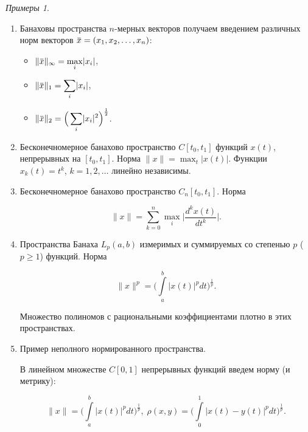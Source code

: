 \documentclass[12pt,a4paper,titlepage,oneside]{book}
\newcommand{\overbar}[1]{\mkern 1.5mu\overline{\mkern-1.5mu#1\mkern-1.5mu}\mkern 1.5mu}
\theoremstyle{definition}
\theoremstyle{plain}
\theoremstyle{break}
\theoremstyle{remark}
\theoremstyle{remark}
\theoremstyle{remark}
\newtheorem*{examples}{Примеры}
\theoremstyle{remark}
\theoremstyle{plain}
\theoremstyle{plain}
\begin{document}
\begin{examples}
\leavevmode
\begin{enumerate}

	\item Банаховы пространства $n$-мерных векторов получаем введением различных норм векторов $\overbar{x} = (x_1,x_2,\ldots,x_n)$:

	\begin{itemize}

		\item $\lVert \overbar{x}\rVert_\infty=\displaystyle\max_{i}\lvert x_i\rvert$,

		\item $\lVert \overbar{x}\rVert_1 = \displaystyle\sum_{i}\lvert x_i\rvert$,

		\item $\lVert \overbar{x}\rVert_2 = \Big( \displaystyle\sum_{i}\lvert x_i\rvert^2 \Big)^{\frac{1}{2}}$.

	\end{itemize}

	\item Бесконечномерное банахово пространство $C[t_0,t_1]$ функций $x(t)$, непрерывных на $[t_0,t_1]$. Норма $\lVert x\rVert = \displaystyle\max_{t}\lvert x(t)\rvert$.
	Функции $x_k(t)=t^k$, $k=1,2,\ldots$ линейно независимы.

	\item Бесконечномерное банахово пространство $C_n[t_0,t_1]$. Норма

	\begin{equation*}
	\lVert x\rVert = \displaystyle\sum_{k=0}^n \max_{i} \Big\lvert\frac{d^kx(t)}{dt^k} \Big\rvert.
	\end{equation*}

	\item Пространства Банаха $L_p(a,b)$ измеримых и суммируемых со степенью $p$ ($p \geqslant 1$) функций. Норма

	\begin{equation*}
	\lVert x\rVert^p = \Big(\int\limits_a^b\lvert x(t)\rvert^p dt \Big)^{\frac{1}{p}}.
	\end{equation*}

	Множество полиномов с рациональными коэффициентами плотно в этих пространствах.

	\item Пример неполного нормированного пространства.

	В линейном множестве $C[0,1]$ непрерывных функций введем норму (и метрику):

	\begin{equation*}
	\lVert x\rVert = \Big(\int\limits_a^b\lvert x(t)\rvert^pdt \Big)^{\frac{1}{p}}, \; \rho(x,y) = \Big(\int\limits_0^1\lvert x(t)-y(t)\rvert^pdt \Big)^{\frac{1}{p}}.
	\end{equation*}


\end{enumerate}
\end{examples}
\end{document}
